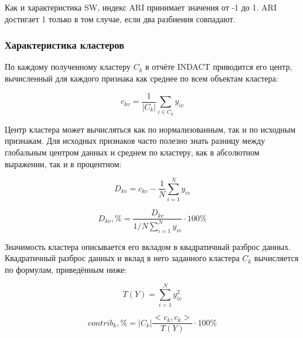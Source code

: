 \documentclass[12pt]{diploma}
\begin{document}
	Как и характеристика SW, индекс ARI принимает значения от -1 до 1. ARI достигает 1 только в том случае, если два разбиения совпадают.
	
	\subsubsection{Характеристика кластеров}
	По каждому полученному кластеру $ C_k $ в отчёте INDACT приводится его центр, вычисленный для каждого признака как среднее по всем объектам кластера:
	
	\begin{equation*} 
	c_{kv} = \frac{1}{|C_k|} \sum_{i \in C_k}^{} y_{iv}
	\end{equation*}
	
	Центр кластера может вычисляться как по нормализованным, так и по исходным признакам. Для исходных признаков часто полезно знать разницу между глобальным центром данных и среднем по кластеру, как в абсолютном выражении, так и в процентном:
	
	\vspace*{1\baselineskip} 
	\noindent\begin{minipage}{.5\linewidth}
		\begin{equation*}
		D_{kv} = c_{kv} - \frac{1}{N} \sum_{i=1}^{N} y_{iv}
		\end{equation*}
	\end{minipage}%
	\begin{minipage}{.5\linewidth}
		\begin{equation*}
		D_{kv},\% = \frac{D_{kv}}{1/N \sum_{i=1}^{N} y_{iv}} \cdot 100 \% 
		\end{equation*}
	\end{minipage}%
	\vspace*{1\baselineskip} 

	Значимость кластера описывается его вкладом в квадратичный разброс данных. Квадратичный разброс данных и вклад в него заданного кластера $ C_k $ вычисляется по формулам, приведённым ниже:
	
	
	\vspace*{1\baselineskip} 
	\noindent\begin{minipage}{.5\linewidth}
		\begin{equation*}
		T(Y) = \sum_{i=1}^{N} y_{iv}^2
		\end{equation*}
	\end{minipage}%
	\begin{minipage}{.5\linewidth}
		\begin{equation*}
		contrib_k,\% =  |C_k| \frac{<c_{k},c_{k}> }{T(Y)}\cdot 100\%
		\end{equation*}
	\end{minipage}%
	\vspace*{1\baselineskip} 
	
\end{document}
